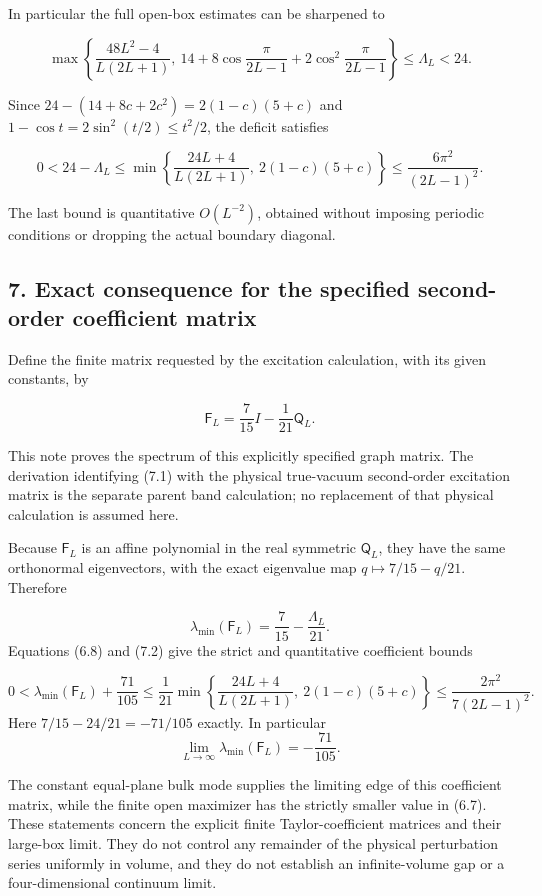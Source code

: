 \documentclass[
  11pt,
]{article}
\begin{document}
In particular the full open-box estimates can be sharpened to

\[
\boxed{
\max\left\{\frac{48L^2-4}{L(2L+1)},\
14+8\cos\frac{\pi}{2L-1}+2\cos^2\frac{\pi}{2L-1}\right\}
\le\Lambda_L<24.}
\tag{6.7}
\]

Since \(24-(14+8c+2c^2)=2(1-c)(5+c)\) and
\(1-\cos t=2\sin^2(t/2)\le t^2/2\), the deficit satisfies

\[
\boxed{
0<24-\Lambda_L
\le\min\left\{
\frac{24L+4}{L(2L+1)},\
2(1-c)(5+c)\right\}
\le\frac{6\pi^2}{(2L-1)^2}.}
\tag{6.8}
\]

The last bound is quantitative \(O(L^{-2})\), obtained without imposing
periodic conditions or dropping the actual boundary diagonal.

\subsection{7. Exact consequence for the specified second-order
coefficient
matrix}\label{magnetic-part-6-exact-consequence-for-the-specified-second-order-coefficient-matrix}

Define the finite matrix requested by the excitation calculation, with
its given constants, by

\[
\mathsf F_L=\frac7{15}I-\frac1{21}\mathsf Q_L.
\tag{7.1}
\]

This note proves the spectrum of this explicitly specified graph matrix.
The derivation identifying (7.1) with the physical true-vacuum
second-order excitation matrix is the separate parent band calculation;
no replacement of that physical calculation is assumed here.

Because \(\mathsf F_L\) is an affine polynomial in the real symmetric
\(\mathsf Q_L\), they have the same orthonormal eigenvectors, with the
exact eigenvalue map \(q\mapsto7/15-q/21\). Therefore

\[
\lambda_{\min}(\mathsf F_L)=\frac7{15}-\frac{\Lambda_L}{21}.
\tag{7.2}
\] Equations (6.8) and (7.2) give the strict and quantitative
coefficient bounds

\[
\boxed{
0<\lambda_{\min}(\mathsf F_L)+\frac{71}{105}
\le\frac1{21}\min\left\{
\frac{24L+4}{L(2L+1)},\
2(1-c)(5+c)\right\}
\le\frac{2\pi^2}{7(2L-1)^2}.}
\tag{7.3}
\] Here \(7/15-24/21=-71/105\) exactly. In particular \[
\boxed{\lim_{L\to\infty}\lambda_{\min}(\mathsf F_L)=-\frac{71}{105}.}
\tag{7.4}
\]

The constant equal-plane bulk mode supplies the limiting edge of this
coefficient matrix, while the finite open maximizer has the strictly
smaller value in (6.7). These statements concern the explicit finite
Taylor-coefficient matrices and their large-box limit. They do not
control any remainder of the physical perturbation series uniformly in
volume, and they do not establish an infinite-volume gap or a
four-dimensional continuum limit.
\end{document}
